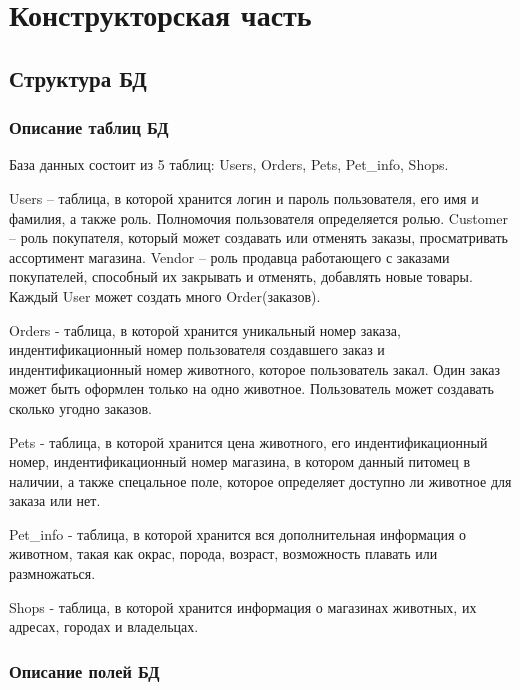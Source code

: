 \chapter{Конструкторская часть}

\section{Структура БД}

\subsection{Описание таблиц БД}

\hspace{0.6cm} База данных состоит из 5 таблиц: Users, Orders, Pets, Pet\_info, Shops.

\hspace{0.6cm} Users – таблица, в которой хранится логин и пароль пользователя, его имя и фамилия, а также роль. Полномочия пользователя определяется ролью. Customer – роль покупателя, который может создавать или отменять заказы, просматривать ассортимент магазина. Vendor – роль продавца работающего с заказами покупателей, способный их закрывать и отменять, добавлять новые товары. Каждый User может создать много Order(заказов).

\hspace{0.6cm} Orders - таблица, в которой хранится уникальный номер заказа, индентификационный номер пользователя создавшего заказ и индентификационный номер животного, которое пользователь закал. Один заказ может быть оформлен только на одно животное. Пользователь может создавать сколько угодно заказов.

\hspace{0.6cm} Pets - таблица, в которой хранится цена животного, его индентификационный номер, индентификационный номер магазина, в котором данный питомец в наличии, а также спецальное поле, которое определяет доступно ли животное для заказа или нет.

\hspace{0.6cm} Pet\_info - таблица, в которой хранится вся дополнительная информация о животном, такая как окрас, порода, возраст, возможность плавать или размножаться.

\hspace{0.6cm} Shops - таблица, в которой хранится информация о магазинах животных, их адресах, городах и владельцах.

\subsection{Описание полей БД}

